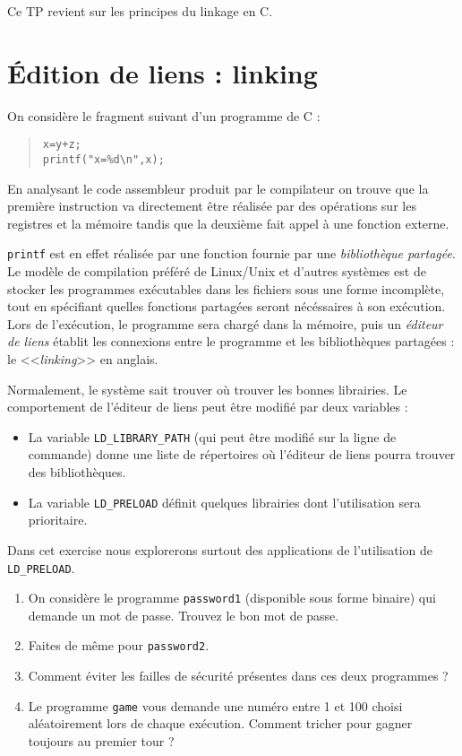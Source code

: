 \documentclass[11pt]{article}
\newcommand{\numtd}{09}
\newcommand{\titretd}{Petit hack entre amis}
\begin{document}
\entete{\numtd}{\titretd}

\begin{introduction}
Ce TP revient sur les principes du linkage en C.
\end{introduction}

\section*{Édition de liens : linking}

On considère le fragment suivant d'un programme de C :
\begin{quote}
\texttt{x=y+z;}\\
\verb+printf("x=%d\n",x);+
\end{quote}

En analysant le code assembleur produit par le compilateur on trouve
que la première instruction va directement être réalisée par
des opérations sur les registres et la mémoire tandis que la deuxième
fait appel à une fonction externe.

\texttt{printf} est en effet réalisée par une fonction fournie par une
\emph{bibliothèque partagée}. Le modèle de compilation préféré
de Linux/Unix et d'autres systèmes est de stocker les programmes exécutables
dans les fichiers sous une forme incomplète, tout en spécifiant quelles
fonctions partagées seront nécéssaires à son exécution. Lors de
l'exécution, le programme sera chargé dans la mémoire, puis un
\emph{éditeur de liens} établit les connexions entre le programme
et les bibliothèques partagées : le <<\emph{linking}>> en anglais.

Normalement, le système sait trouver où trouver les bonnes librairies.
Le comportement de l'éditeur de liens peut être modifié par deux
variables :
\begin{itemize}
\item La variable \texttt{LD\_LIBRARY\_PATH} (qui peut être modifié
  sur la ligne de commande) donne une liste de répertoires où l'éditeur
  de liens pourra trouver des bibliothèques.
\item La variable \texttt{LD\_PRELOAD} définit quelques librairies dont
  l'utilisation sera prioritaire.
\end{itemize}

Dans cet exercise nous explorerons surtout des applications de l'utilisation de
\texttt{LD\_PRELOAD}.

\begin{enumerate}
\item On considère le programme \texttt{password1} (disponible sous forme
  binaire) qui demande un mot de passe. Trouvez le bon mot de passe.
\item Faites de même pour \texttt{password2}.
\item Comment éviter les failles de sécurité présentes dans ces
  deux programmes ?
\item Le programme \texttt{game} vous demande une numéro entre 1 et 100
  choisi aléatoirement lors de chaque exécution. Comment tricher pour
  gagner toujours au premier tour ?
\end{enumerate}
\end{document}
